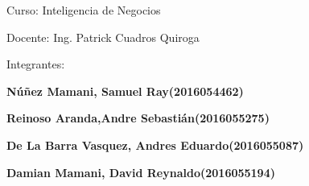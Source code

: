 \documentclass[12pt]{report}
\begin{document}
\vspace{\baselineskip}
\begin{Center}
{\fontsize{16pt}{19.2pt}\selectfont Curso: Inteligencia de Negocios\par}
\end{Center}\par


\vspace{\baselineskip}

\vspace{\baselineskip}
\begin{Center}
{\fontsize{16pt}{19.2pt}\selectfont Docente: Ing. Patrick Cuadros Quiroga\par}
\end{Center}\par


\vspace{\baselineskip}
{\fontsize{16pt}{19.2pt}\selectfont Integrantes:\par}\par


\vspace{\baselineskip}
{\fontsize{16pt}{19.2pt}\selectfont \textbf{Núñez Mamani, Samuel Ray\tab \tab \tab \tab (2016054462)}\par}\par

{\fontsize{16pt}{19.2pt}\selectfont \textbf{Reinoso Aranda,Andre Sebastián\tab \tab (2016055275)}\par}\par

{\fontsize{16pt}{19.2pt}\selectfont \textbf{De La Barra Vasquez, Andres Eduardo\tab (2016055087)}\par}\par

\begin{adjustwidth}{0.49in}{0.0in}
{\fontsize{16pt}{19.2pt}\selectfont \textbf{Damian Mamani, David Reynaldo\tab \tab (2016055194)}\par}\par

\end{adjustwidth}


\vspace{\baselineskip}

\vspace{\baselineskip}

\vspace{\baselineskip}

\vspace{\baselineskip}
\end{document}

